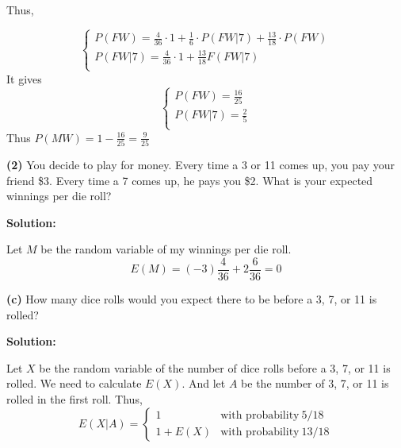 \documentclass[11pt]{article}
\renewcommand\part[1]{\vspace{.10in}\textbf{(#1)}}
\newcommand{\solution}{\vspace{.10in}\textbf{Solution: }}
\begin{document}
Thus,

\begin{equation*}
    \begin{cases}
        P(FW) = \frac{4}{36} \cdot 1 + \frac{1}{6} \cdot P(FW|7) + \frac{13}{18} \cdot P(FW) \\
        P(FW|7) = \frac{4}{36} \cdot 1 + \frac{13}{18}F(FW|7) \\
    \end{cases}
\end{equation*}
It gives
\begin{equation*}
    \begin{cases}
        P(FW) = \frac{16}{25} \\
        P(FW|7) = \frac{2}{5} \\
    \end{cases}
\end{equation*}
Thus $P(MW) = 1 - \frac{16}{25} = \frac{9}{25}$

\part{2}
You decide to play for money. Every time a 3 or 11 comes up, you pay your friend \$3. Every time a 7 comes up, he pays you \$2. What is your expected winnings per die roll?

\solution

Let $M$ be the random variable of my winnings per die roll.
\begin{equation}
    E(M) = (-3)\frac{4}{36} + 2\frac{6}{36} = 0
\end{equation}

\part{c}
How many dice rolls would you expect there to be before a 3, 7, or 11 is rolled?

\solution

Let $X$ be the random variable of the number of dice rolls before a 3, 7, or 11 is rolled.
We need to calculate $E(X)$. And let $A$ be the number of 3, 7, or 11 is rolled in the first roll.
Thus, 
\begin{equation}
    E\left( X|A\right)  =\begin{cases}1&\text{with probability} \  5/18\\ 1+E(X)&\text{with probability} \  13/18\end{cases} 
\end{equation}
    
\end{document}
